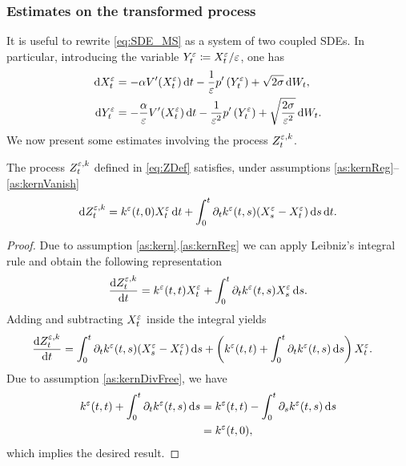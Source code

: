 \documentclass[10pt]{article}
\begin{document}
\subsubsection{Estimates on the transformed process}

It is useful to rewrite \eqref{eq:SDE_MS} as a system of two coupled SDEs. In particular, introducing the variable $Y^\varepsilon_t \coloneqq X^\varepsilon_t / \varepsilon$, one has
\begin{equation}\label{eq:SDE_MS2}
\begin{aligned}
	\mathrm{d} X_t^\varepsilon &= -\alpha V'(X_t^\varepsilon) \,\mathrm{d} t - \frac1{\varepsilon} p'\left(Y_t^\varepsilon\right) + \sqrt{2\sigma} \,\mathrm{d} W_t, \\
	\mathrm{d} Y_t^\varepsilon &= -\frac{\alpha}{\varepsilon} V'(X_t^\varepsilon) \,\mathrm{d} t - \frac1{\varepsilon^2} p'\left(Y^\varepsilon_t\right) + \sqrt{\frac{2\sigma}{\varepsilon^2}} \,\mathrm{d} W_t.
\end{aligned}
\end{equation}
We now present some estimates involving the process $Z_t^{\varepsilon, k}$.
\begin{lemma}\label{lem:ZRewriting} The process $Z_t^{\varepsilon, k}$ defined in \eqref{eq:ZDef} satisfies, under assumptions \ref{as:kernReg}--\ref{as:kernVanish}
	\begin{equation}
	\mathrm{d} Z_t^{\varepsilon, k} = k^\varepsilon(t, 0) X^\varepsilon_t \,\mathrm{d} t + \int_0^t \partial_t k^\varepsilon(t, s) (X^\varepsilon_s - X^\varepsilon_t) \,\mathrm{d} s \,\mathrm{d} t.
	\end{equation}
\end{lemma}
\begin{proof} Due to assumption \ref{as:kern}.\ref{as:kernReg} we can apply Leibniz's integral rule and obtain the following representation
	\begin{equation}
	\frac{\mathrm{d} Z^{\varepsilon,k}_t}{\mathrm{d} t} = k^\varepsilon(t, t)X^\varepsilon_t + \int_0^t \partial_t k^\varepsilon(t, s) X^\varepsilon_s \,\mathrm{d} s.
	\end{equation}
	Adding and subtracting $X_t^\varepsilon$ inside the integral yields
	\begin{equation}
	\begin{aligned}
	\frac{\mathrm{d} Z^{\varepsilon,k}_t}{\mathrm{d} t} &= \int_0^t \partial_t k^\varepsilon(t, s) (X^\varepsilon_s - X^\varepsilon_t) \,\mathrm{d} s + \left(k^\varepsilon(t, t) + \int_0^t \partial_t k^\varepsilon(t, s) \,\mathrm{d} s\right)X^\varepsilon_t.
	\end{aligned}
	\end{equation}
	Due to assumption \ref{as:kernDivFree}, we have
	\begin{equation}
	\begin{aligned}
	k^\varepsilon(t, t) + \int_0^t \partial_t k^\varepsilon(t, s) \,\mathrm{d} s &= k^\varepsilon(t, t) - \int_0^t \partial_s k^\varepsilon(t, s) \,\mathrm{d} s\\
	&= k^\varepsilon(t, 0),
	\end{aligned}
	\end{equation}
	which implies the desired result.
\end{proof}
\end{document}
